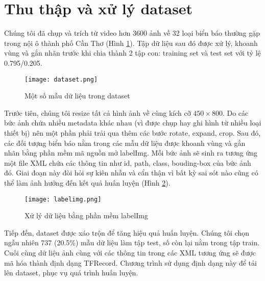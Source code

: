 \documentclass[../thesis.tex]{subfiles}
\begin{document}
\section{Thu thập và xử lý dataset}

Chúng tôi đã chụp và trích từ video hơn 3600 ảnh về 32 loại biển báo thường gặp trong nội ô thành phố Cần Thơ (Hình \ref{Fig:dataset_records}). Tập dữ liệu sau đó được xử lý, khoanh vùng và gắn nhãn trước khi chia thành 2 tập con: training set và test set với tỷ lệ 0.795/0.205.

\begin{figure}[!htb]
	\centering
	\texttt{[image: dataset.png]}
	\caption{Một số mẫu dữ liệu trong dataset}\label{Fig:dataset_records}
\end{figure}

Trước tiên, chúng tôi resize tất cả hình ảnh về cùng kích cỡ $450 \times 800$. Do các bức ảnh chứa nhiều metadata khác nhau (vì được chụp hay ghi hình từ nhiều loại thiết bị) nên một phần phải trải qua thêm các bước rotate, expand, crop. Sau đó, các đối tượng biển báo nằm trong các mẫu dữ liệu được khoanh vùng và gắn nhãn bằng phần mềm mã nguồn mở labelImg\cite{labelimg}. Mỗi bức ảnh sẽ sinh ra tương ứng một file XML chứa các thông tin như id, path, class, bouding-box của bức ảnh đó. Giai đoạn này đòi hỏi sự kiên nhẫn và cẩn thận vì bất kỳ sai sót nào cũng có thể làm ảnh hưởng đến kết quả huấn luyện (Hình \ref{Fig:labelimg}).

\begin{figure}[!htb]
	\centering
	\texttt{[image: labelimg.png]}
	\caption{Xử lý dữ liệu bằng phần mềm labelImg}\label{Fig:labelimg}
\end{figure}

Tiếp đến, dataset được xáo trộn để tăng hiệu quả huấn luyện. Chúng tôi chọn ngẫu nhiên 737 (20.5\%) mẫu dữ liệu làm tập test, số còn lại nằm trong tập train. Cuối cùng dữ liệu ảnh cùng với các thông tin trong các XML tương ứng sẽ được mã hóa thành định dạng TFRecord. Chương trình sử dụng định dạng này để tải lên dataset, phục vụ quá trình huấn luyện.
\end{document}
